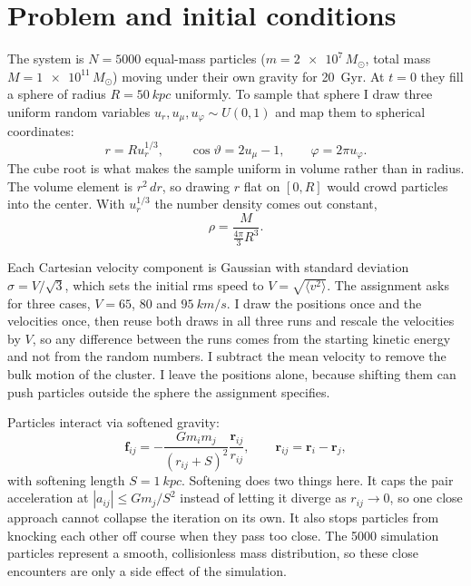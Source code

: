 \documentclass[12pt,a4paper]{article}
\begin{document}
\tableofcontents
\newpage
{}

\section{Problem and initial conditions}\label{sec:problem}

The system is $N=5000$ equal-mass particles ($m = \num{2e7}\,M_\odot$, total mass $M=\num{1e11}\,M_\odot$) moving under their own gravity for \SI{20}{Gyr}. At $t=0$ they fill a sphere of radius $R=\SI{50}{kpc}$ uniformly. To sample that sphere I draw three uniform random variables $u_r, u_\mu, u_\varphi \sim U(0,1)$ and map them to spherical coordinates:
\begin{equation}
    r = R u_r^{1/3},
    \qquad
    \cos\vartheta = 2u_\mu - 1,
    \qquad
    \varphi = 2\pi u_\varphi.
\end{equation}
The cube root is what makes the sample uniform in volume rather than in radius. The volume element is $r^2\,dr$, so drawing $r$ flat on $[0,R]$ would crowd particles into the center. With $u_r^{1/3}$ the number density comes out constant,
\begin{equation}
    \rho = \frac{M}{\frac{4\pi}{3}R^3}.
\end{equation}

Each Cartesian velocity component is Gaussian with standard deviation $\sigma = V/\sqrt{3}$, which sets the initial rms speed to $V = \sqrt{\langle v^2\rangle}$. The assignment asks for three cases, $V = 65$, $80$ and $\SI{95}{km/s}$. I draw the positions once and the velocities once, then reuse both draws in all three runs and rescale the velocities by $V$, so any difference between the runs comes from the starting kinetic energy and not from the random numbers. I subtract the mean velocity to remove the bulk motion of the cluster. I leave the positions alone, because shifting them can push particles outside the sphere the assignment specifies.

Particles interact via softened gravity:
\begin{equation}\label{eq:softforce}
    \mathbf{f}_{ij}=-\frac{Gm_im_j}{(r_{ij}+S)^2}
    \frac{\mathbf{r}_{ij}}{r_{ij}},
    \qquad \mathbf{r}_{ij}=\mathbf{r}_i-\mathbf{r}_j,
\end{equation}
with softening length $S=\SI{1}{kpc}$. Softening does two things here. It caps the pair acceleration at $|a_{ij}| \le G m_j / S^2$ instead of letting it diverge as $r_{ij} \to 0$, so one close approach cannot collapse the iteration on its own. It also stops particles from knocking each other off course when they pass too close. The 5000 simulation particles represent a smooth, collisionless mass distribution, so these close encounters are only a side effect of the simulation.
\end{document}
